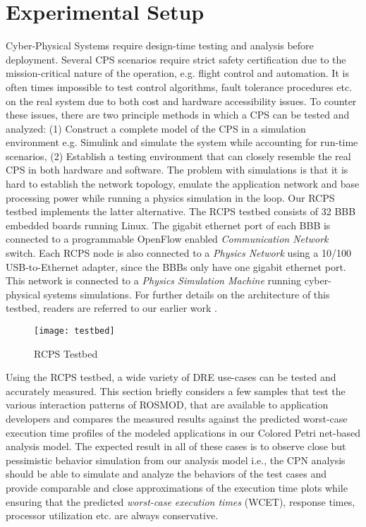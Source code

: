 \section{Experimental Setup}
\label{sec:Testbed}

Cyber-Physical Systems require design-time testing and analysis before deployment. Several CPS scenarios require strict safety certification due to the mission-critical nature of the operation, e.g. flight control and automation. It is often times impossible to test control algorithms, fault tolerance procedures etc. on the real system due to both cost and hardware accessibility issues. To counter these issues, there are two principle methods in which a CPS can be tested and analyzed: (1) Construct a complete model of the CPS in a simulation environment e.g. Simulink \cite{Simulink} and simulate the system while accounting for run-time scenarios, (2) Establish a testing environment that can closely resemble the real CPS in both hardware and software. The problem with simulations is that it is hard to establish the network topology, emulate the application network and base processing power while running a physics simulation in the loop. Our RCPS testbed implements the latter alternative. The RCPS testbed consists of 32 BBB embedded boards running Linux. The gigabit ethernet port of each BBB is connected to a programmable OpenFlow \cite{openflow} enabled \emph{Communication Network} switch. Each RCPS node is also connected to a \emph{Physics Network} using a 10/100 USB-to-Ethernet adapter, since the BBBs only have one gigabit ethernet port. This network is connected to a \emph{Physics Simulation Machine} running cyber-physical systems simulations. For further details on the architecture of this testbed, readers are referred to our earlier work \cite{kumarTestbed}.

\begin{figure}[h]
	\centering
	\texttt{[image: testbed]}
	\caption{RCPS Testbed}
	\label{fig:testbed}
\end{figure}
\fi

Using the RCPS testbed, a wide variety of DRE use-cases can be tested and accurately measured. This section briefly considers a few samples that test the various interaction patterns of ROSMOD, that are available to application developers and compares the measured results against the predicted worst-case execution time profiles of the modeled applications in our Colored Petri net-based analysis model. The expected result in all of these cases is to observe close but pessimistic behavior simulation from our analysis model i.e., the CPN analysis should be able to simulate and analyze the behaviors of the test cases and provide comparable and close approximations of the execution time plots while ensuring that the predicted \emph{worst-case execution times} (WCET), response times, processor utilization etc. are always conservative.